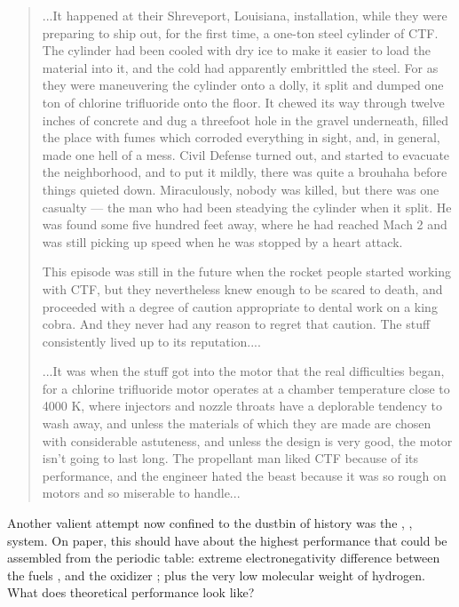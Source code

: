 \documentclass[twocolumn]{memoir} %
\begin{document}
\begin{quote}
    ...It happened at their Shreveport, Louisiana, installation, while they
    were preparing to ship out, for the first time, a one-ton steel cylinder
    of CTF. The cylinder had been cooled with dry ice to make it easier
    to load the material into it, and the cold had apparently embrittled
    the steel. For as they were maneuvering the cylinder onto a dolly,
    it split and dumped one ton of chlorine trifluoride onto the floor. It
    chewed its way through twelve inches of concrete and dug a threefoot hole 
    in the gravel underneath, filled the place with fumes which
    corroded everything in sight, and, in general, made one hell of a mess.
    Civil Defense turned out, and started to evacuate the neighborhood,
    and to put it mildly, there was quite a brouhaha before things quieted
    down. Miraculously, nobody was killed, but there was one casualty —
    the man who had been steadying the cylinder when it split. He was
    found some five hundred feet away, where he had reached Mach 2
    and was still picking up speed when he was stopped by a heart attack.
    
    This episode was still in the future when the rocket people started
    working with CTF, but they nevertheless knew enough to be scared
    to death, and proceeded with a degree of caution appropriate to dental work on a 
    king cobra. And they never had any reason to regret that caution. The stuff 
    consistently lived up to its reputation....

    ...It was when the stuff got into the motor that the real difficulties began, 
    for a chlorine trifluoride motor operates at a chamber temperature close to 
    4000 K, where injectors and nozzle throats have a deplorable tendency to wash
    away, and unless the materials of which they are made are chosen with considerable 
    astuteness, and unless the design is very good, the motor isn't going to last long. 
    The propellant man liked CTF because of its performance, and the engineer hated the 
    beast because it was so rough on motors and so miserable to handle...
\end{quote}

Another valient attempt now confined to the dustbin of history was the , ,
 system.  On paper, this should have about the highest performance that could be
assembled from the periodic table: extreme electronegativity difference between the
fuels ,  and the oxidizer ; plus the very low molecular weight
of hydrogen.  What does theoretical performance look like?
\end{document}
